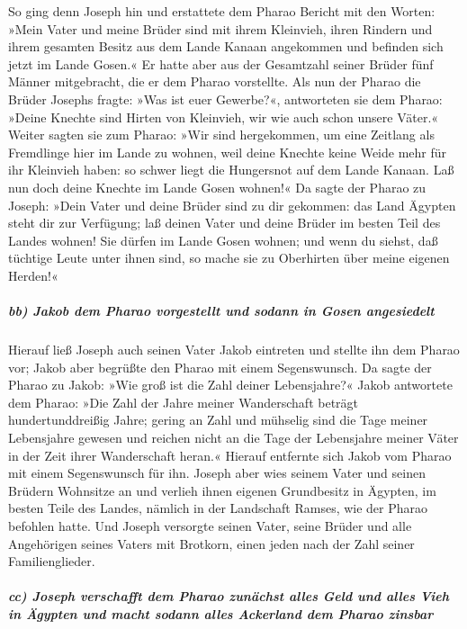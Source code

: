  So ging denn Joseph hin und erstattete dem Pharao Bericht
mit den Worten: »Mein Vater und meine Brüder sind mit ihrem Kleinvieh,
ihren Rindern und ihrem gesamten Besitz aus dem Lande Kanaan angekommen
und befinden sich jetzt im Lande Gosen.«  Er hatte aber
aus der Gesamtzahl seiner Brüder fünf Männer mitgebracht, die er dem
Pharao vorstellte.  Als nun der Pharao die Brüder Josephs
fragte: »Was ist euer Gewerbe?«, antworteten sie dem Pharao: »Deine
Knechte sind Hirten von Kleinvieh, wir wie auch schon unsere Väter.«
 Weiter sagten sie zum Pharao: »Wir sind hergekommen, um
eine Zeitlang als Fremdlinge hier im Lande zu wohnen, weil deine Knechte
keine Weide mehr für ihr Kleinvieh haben: so schwer liegt die Hungersnot
auf dem Lande Kanaan. Laß nun doch deine Knechte im Lande Gosen wohnen!«
 Da sagte der Pharao zu Joseph: »Dein Vater und deine
Brüder sind zu dir gekommen:  das Land Ägypten steht dir
zur Verfügung; laß deinen Vater und deine Brüder im besten Teil des
Landes wohnen! Sie dürfen im Lande Gosen wohnen; und wenn du siehst, daß
tüchtige Leute unter ihnen sind, so mache sie zu Oberhirten über meine
eigenen Herden!«

\hypertarget{bb-jakob-dem-pharao-vorgestellt-und-sodann-in-gosen-angesiedelt}{%
\subparagraph{bb) Jakob dem Pharao vorgestellt und sodann in Gosen
angesiedelt}\label{bb-jakob-dem-pharao-vorgestellt-und-sodann-in-gosen-angesiedelt}}

 Hierauf ließ Joseph auch seinen Vater Jakob eintreten und
stellte ihn dem Pharao vor; Jakob aber begrüßte den Pharao mit einem
Segenswunsch.  Da sagte der Pharao zu Jakob: »Wie groß ist
die Zahl deiner Lebensjahre?«  Jakob antwortete dem
Pharao: »Die Zahl der Jahre meiner Wanderschaft beträgt
hundertunddreißig Jahre; gering an Zahl und mühselig sind die Tage
meiner Lebensjahre gewesen und reichen nicht an die Tage der Lebensjahre
meiner Väter in der Zeit ihrer Wanderschaft heran.« 
Hierauf entfernte sich Jakob vom Pharao mit einem Segenswunsch für ihn.
 Joseph aber wies seinem Vater und seinen Brüdern
Wohnsitze an und verlieh ihnen eigenen Grundbesitz in Ägypten, im besten
Teile des Landes, nämlich in der Landschaft Ramses, wie der Pharao
befohlen hatte.  Und Joseph versorgte seinen Vater, seine
Brüder und alle Angehörigen seines Vaters mit Brotkorn, einen jeden nach
der Zahl seiner Familienglieder.

\hypertarget{cc-joseph-verschafft-dem-pharao-zunuxe4chst-alles-geld-und-alles-vieh-in-uxe4gypten-und-macht-sodann-alles-ackerland-dem-pharao-zinsbar}{%
\subparagraph{cc) Joseph verschafft dem Pharao zunächst alles Geld und
alles Vieh in Ägypten und macht sodann alles Ackerland dem Pharao
zinsbar}\label{cc-joseph-verschafft-dem-pharao-zunuxe4chst-alles-geld-und-alles-vieh-in-uxe4gypten-und-macht-sodann-alles-ackerland-dem-pharao-zinsbar}}

